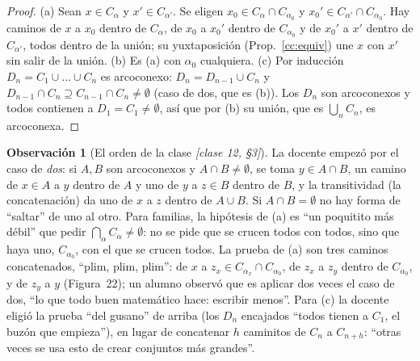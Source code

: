 \documentclass[11pt,a4paper]{article}
\theoremstyle{definition}
\newtheorem{observacion}[definicion]{Observación}
\theoremstyle{plain}
\newcommand{\fnt}[1]{{\normalfont\small\itshape\color{gray!150!black}[#1]}}
\begin{document}
\begin{proof}
(a) Sean $x\in C_\alpha$ y $x'\in C_{\alpha'}$. Se eligen $x_0\in C_\alpha\cap C_{\alpha_0}$ y $x_0'\in C_{\alpha'}\cap C_{\alpha_0}$. Hay caminos de $x$ a $x_0$ dentro de $C_\alpha$, de $x_0$ a $x_0'$ dentro de $C_{\alpha_0}$ y de $x_0'$ a $x'$ dentro de $C_{\alpha'}$, todos dentro de la unión; su yuxtaposición (Prop.~\ref{cc:equiv}) une $x$ con $x'$ sin salir de la unión.
(b) Es (a) con $\alpha_0$ cualquiera.
(c) Por inducción $D_n=C_1\cup\dots\cup C_n$ es arcoconexo: $D_{n}=D_{n-1}\cup C_n$ y $D_{n-1}\cap C_n\supseteq C_{n-1}\cap C_n\ne\emptyset$ (caso de dos, que es (b)). Los $D_n$ son arcoconexos y todos contienen a $D_1=C_1\ne\emptyset$, así que por (b) su unión, que es $\bigcup_n C_n$, es arcoconexa.
\end{proof}

\begin{observacion}[El orden de la clase \fnt{clase 12, \S3}]
La docente empezó por el caso de \emph{dos}: si $A,B$ son arcoconexos y $A\cap B\ne\emptyset$, se toma $y\in A\cap B$, un camino de $x\in A$ a $y$ dentro de $A$ y uno de $y$ a $z\in B$ dentro de $B$, y la transitividad (la concatenación) da uno de $x$ a $z$ dentro de $A\cup B$. Si $A\cap B=\emptyset$ no hay forma de ``saltar'' de uno al otro. Para familias, la hipótesis de (a) es ``un poquitito más débil'' que pedir $\bigcap_\alpha C_\alpha\ne\emptyset$: no se pide que se crucen todos con todos, sino que haya uno, $C_{\alpha_0}$, con el que se crucen todos. La prueba de (a) son tres caminos concatenados, ``plim, plim, plim'': de $x$ a $z_x\in C_{\alpha_x}\cap C_{\alpha_0}$, de $z_x$ a $z_y$ dentro de $C_{\alpha_0}$, y de $z_y$ a $y$ (Figura~22); un alumno observó que es aplicar dos veces el caso de dos, ``lo que todo buen matemático hace: escribir menos''. Para (c) la docente eligió la prueba ``del gusano'' de arriba (los $D_n$ encajados ``todos tienen a $C_1$, el buzón que empieza''), en lugar de concatenar $h$ caminitos de $C_n$ a $C_{n+h}$: ``otras veces se usa esto de crear conjuntos más grandes''.
\end{observacion}
\end{document}
